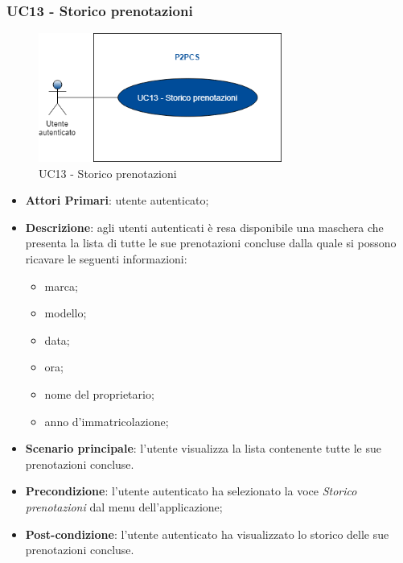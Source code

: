\subsubsection{UC13 - Storico prenotazioni}
 \begin{figure}[h]
	\includegraphics[width=8cm]{res/images/Schemagenerale4.png}
	\centering
	\caption{UC13 - Storico prenotazioni}
\end{figure}
\begin{itemize}
	\item \textbf{Attori Primari}: utente autenticato;
	\item \textbf{Descrizione}: agli utenti autenticati è resa disponibile una maschera che presenta la lista di tutte le sue prenotazioni concluse dalla quale si possono ricavare le seguenti informazioni:
	\begin{itemize}
		\item marca;
		\item modello;
		\item data;
		\item ora;
		\item nome del proprietario;
		\item anno d'immatricolazione;
	\end{itemize} 
	\item \textbf{Scenario principale}: l'utente visualizza la lista contenente tutte le sue prenotazioni concluse.
	\item \textbf{Precondizione}: l'utente autenticato ha selezionato la voce \textit{Storico prenotazioni} dal menu dell'applicazione;
	\item \textbf{Post-condizione}: l'utente autenticato ha visualizzato lo storico delle sue prenotazioni concluse. 
\end{itemize} 
